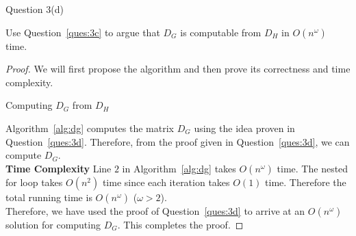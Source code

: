 \begin{solution}{Question 3(d)}\label{ques:3d}
    \begin{question}
      Use Question~\ref{ques:3c} to argue that $D_G$ is computable from $D_H$ in $O(n^\omega)$ time.
    \end{question}
    \tcblower{}
    \begin{proof}
      We will first propose the algorithm and then prove its correctness and time complexity.
      \begin{algorithm}[H]
        \caption{Computing $D_G$ from $D_H$}\label{alg:dg}
        \begin{algorithmic}[1]
                \Else{}
                \EndIf{}
              \EndFor{}
            \EndFor{}
          \EndProcedure{}
        \end{algorithmic}
      \end{algorithm}
      Algorithm~\ref{alg:dg} computes the matrix $D_G$ using the idea proven in Question~\ref{ques:3d}. Therefore, from the proof given in Question~\ref{ques:3d}, we can compute $D_G$.\\
      \textbf{Time Complexity} Line $2$ in Algorithm~\ref{alg:dg} takes $O(n^\omega)$ time. The nested for loop takes $O(n^2)$ time since each iteration takes $O(1)$ time. Therefore the total running time is $O(n^\omega)$ ($\omega > 2$).\\
      Therefore, we have used the proof of Question~\ref{ques:3d} to arrive at an $O(n^\omega)$ solution for computing $D_G$. This completes the proof.
    \end{proof}
\end{solution}

